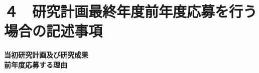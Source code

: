 \documentclass[11pt,a4j,dvipdfmx]{jarticle} 					%
\newcommand{\研究課題名}{大量の脆弱性・攻撃手段・パッチの依存関係を考慮した証明付き修正計画の自動生成}
\newcommand{\研究機関名}{電気通信大学}
\newcommand{\研究代表者氏名}{田原 康之}
\newcommand{\研究期間の最終元号年度}{12}  %
\begin{document}



\section{４　研究計画最終年度前年度応募を行う場合の記述事項}

\newcommand{\最終年度研究種目名}{}
\newcommand{\最終年度研究課題番号}{}
\newcommand{\最終年度研究課題名}{}
\newcommand{\最終年度研究期間}{令和　年度〜令和\一年目 年度}


\noindent
\textbf{当初研究計画及び研究成果}\\


\noindent
\textbf{前年度応募する理由}\\




\end{document}
